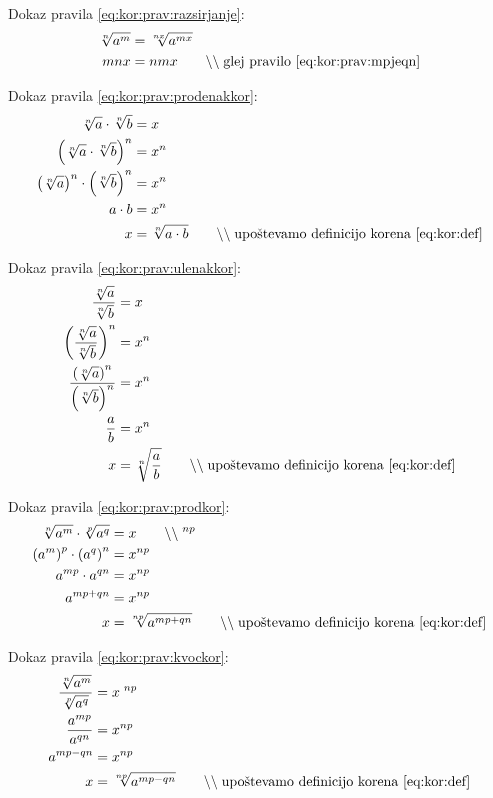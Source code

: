 \documentclass[a4paper,oneside,12pt,fleqn]{article}
\newcommand\krat\cdot
\newcommand{\comment}[1]{\ensuremath{\qquad\backslash\backslash\;}\textnormal{#1}}
\numberwithin{equation}{section}
\begin{document}
Dokaz pravila \ref{eq:kor:prav:razsirjanje}:
\begin{align*}
  \sqrt[n]{a^m} &= \sqrt[nx]{a^{mx}} \\
  mnx &= nmx \comment{glej pravilo \eqref{eq:kor:prav:mpjeqn}}
\end{align*}

Dokaz pravila \ref{eq:kor:prav:prodenakkor}:
\begin{align*}
  \sqrt[n]{a} \krat \sqrt[n]{b} &= x \\
  \left( \sqrt[n]{a} \krat \sqrt[n]{b} \right)^n &= x^n \\
  \left(\sqrt[n]{a}\right)^n \krat \left(\sqrt[n]{b} \right)^n &= x^n \\
  a \krat b &= x^n \\
  x &= \sqrt[n]{a\krat b} \comment{upoštevamo definicijo korena \eqref{eq:kor:def}}
\end{align*}

Dokaz pravila \ref{eq:kor:prav:ulenakkor}:
\begin{align*}
  \frac{\sqrt[n]{a}}{\sqrt[n]{b}} &= x \\
  \left( \frac{\sqrt[n]{a}}{\sqrt[n]{b}} \right)^n &= x^n \\
  \frac{\left( \sqrt[n]{a} \right)^n}{\left( \sqrt[n]{b} \right)^n} &= x^n \\
  \frac{a}{b} &= x^n \\
  x &= \sqrt[n]{\frac{a}{b}} \comment{upoštevamo definicijo korena \eqref{eq:kor:def}}
\end{align*}

Dokaz pravila \ref{eq:kor:prav:prodkor}:
\begin{align*}
  \sqrt[n]{a^m} \krat \sqrt[p]{a^q} &= x \comment{$^{np}$} \\
  \left( a^m \right)^p \krat \left( a^q \right)^n &= x^{np} \\
  a^{mp} \krat a^{qn} &= x^{np} \\
  a^{mp + qn} &= x^{np} \\
  x &= \sqrt[np]{a^{mp+qn}} \comment{upoštevamo definicijo korena \eqref{eq:kor:def}}
\end{align*}

Dokaz pravila \ref{eq:kor:prav:kvockor}:
\begin{align*}
  \frac{\sqrt[n]{a^m}}{\sqrt[p]{a^q}} &= x \; ^{np} \\
  \frac{a^{mp}}{a^{qn}} &= x^{np} \\
  a^{mp-qn} &= x^{np} \\
  x &= \sqrt[np]{a^{mp-qn}} \comment{upoštevamo definicijo korena \eqref{eq:kor:def}}
\end{align*}
\end{document}
